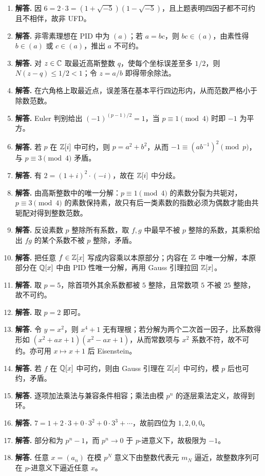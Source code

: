 \begin{enumerate}[label=\textbf{\arabic*.}, leftmargin=*, itemsep=1em]
\item \textbf{解答.} 因 $6=2\cdot3=(1+\sqrt{-5})(1-\sqrt{-5})$，且上题表明四因子都不可约且不相伴，故非 UFD。
\item \textbf{解答.} 非零素理想在 PID 中为 $(a)$；若 $a=bc$，则 $bc\in(a)$，由素性得 $b\in(a)$ 或 $c\in(a)$，推出 $a$ 不可约。
\item \textbf{解答.} 对 $z\in\mathbb{C}$ 取最近高斯整数 $q$，使每个坐标误差至多 $1/2$，则 $N(z-q)\le1/2<1$；令 $z=a/b$ 即得带余除法。
\item \textbf{解答.} 在六角格上取最近点，误差落在基本平行四边形内，从而范数严格小于除数范数。
\item \textbf{解答.} Euler 判别给出 $(-1)^{(p-1)/2}=1$，当 $p\equiv1\pmod4$ 时即 $-1$ 为平方。
\item \textbf{解答.} 若 $p$ 在 $\mathbb{Z}[i]$ 中可约，则 $p=a^2+b^2$，从而 $-1\equiv (ab^{-1})^2\pmod p$，与 $p\equiv3\pmod4$ 矛盾。
\item \textbf{解答.} 有 $2=(1+i)^2\cdot(-i)$，故在 $\mathbb{Z}[i]$ 中分歧。
\item \textbf{解答.} 由高斯整数中的唯一分解：$p\equiv1\pmod4$ 的素数分裂为共轭对，$p\equiv3\pmod4$ 的素数保持素，故只有后一类素数的指数必须为偶数才能由共轭配对得到整数范数。
\item \textbf{解答.} 反设素数 $p$ 整除所有系数，取 $f,g$ 中最早不被 $p$ 整除的系数，其乘积给出 $fg$ 的某个系数不被 $p$ 整除，矛盾。
\item \textbf{解答.} 把任意 $f\in\mathbb{Z}[x]$ 写成内容乘以本原部分；内容在 $\mathbb{Z}$ 中唯一分解，本原部分在 $\mathbb{Q}[x]$ 中由 PID 性唯一分解，再用 Gauss 引理拉回 $\mathbb{Z}[x]$。
\item \textbf{解答.} 取 $p=5$，除首项外其余系数都被 $5$ 整除，且常数项 $5$ 不被 $25$ 整除，故不可约。
\item \textbf{解答.} 取 $p=2$ 即可。
\item \textbf{解答.} 令 $y=x^2$，则 $x^4+1$ 无有理根；若分解为两个二次首一因子，比系数得形如 $(x^2+ax+1)(x^2-ax+1)$，从而常数项与 $x^2$ 系数不符，故不可约。亦可用 $x\mapsto x+1$ 后 Eisenstein。
\item \textbf{解答.} 若 $f$ 在 $\mathbb{Q}[x]$ 中可约，则由 Gauss 引理在 $\mathbb{Z}[x]$ 中可约，模 $p$ 后也可约，矛盾。
\item \textbf{解答.} 逐项加法乘法与兼容条件相容；乘法由模 $p^n$ 的逐层乘法定义，故得到环。
\item \textbf{解答.} $7=1+2\cdot3+0\cdot3^2+0\cdot3^3+\cdots$，故前四位为 $1,2,0,0$。
\item \textbf{解答.} 部分和为 $p^n-1$，而 $p^n\to0$ 于 $p$-进意义下，故极限为 $-1$。
\item \textbf{解答.} 任意 $x=(a_n)$ 在模 $p^N$ 意义下由整数代表元 $m_N$ 逼近，故整数序列可在 $p$-进意义下逼近任意 $x$。

\end{enumerate}
